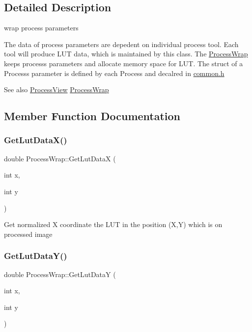 \subsection{Detailed Description}
wrap process parameters 

The data of process parameters are depedent on individual process tool. Each tool will produce L\+UT data, which is maintained by this class. The \mbox{\hyperlink{class_process_wrap}{Process\+Wrap}} keeps process\textquotesingle{}s parameters and allocate memory space for L\+UT. The struct of a Process\textquotesingle{}s parameter is defined by each Process and decalred in \mbox{\hyperlink{common_8h}{common.\+h}} \begin{DoxySeeAlso}{See also}
\mbox{\hyperlink{class_process_view}{Process\+View}} \mbox{\hyperlink{class_process_wrap}{Process\+Wrap}} 
\end{DoxySeeAlso}


\subsection{Member Function Documentation}
\mbox{\label{class_process_wrap_a21c63fcb4fec0ca44ad0d8dcd41d1fa3}} 
\subsubsection{\texorpdfstring{Get\+Lut\+Data\+X()}{GetLutDataX()}}
{\footnotesize\ttfamily double Process\+Wrap\+::\+Get\+Lut\+DataX (\begin{DoxyParamCaption}\item[{int}]{x,  }\item[{int}]{y }\end{DoxyParamCaption})\hspace{0.3cm}{\ttfamily [inline]}}

Get normalized X coordinate the L\+UT in the position (X,Y) which is on processed image \mbox{\label{class_process_wrap_a644d6814dc0d8d744470d81862900ff8}} 
\subsubsection{\texorpdfstring{Get\+Lut\+Data\+Y()}{GetLutDataY()}}
{\footnotesize\ttfamily double Process\+Wrap\+::\+Get\+Lut\+DataY (\begin{DoxyParamCaption}\item[{int}]{x,  }\item[{int}]{y }\end{DoxyParamCaption})\hspace{0.3cm}{\ttfamily [inline]}}

